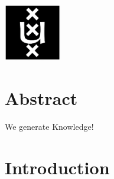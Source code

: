 \documentclass{article}
\newcommand{\red}[1]{{\color{red}{#1}}}
\begin{document}
\begin{titlepage}
\begin{minipage}[t]{0.4\textwidth}
\begin{flushright}
\end{flushright}

\end{minipage}\\[2cm]









\includegraphics[width=2.5cm]{data/images/uva.png}\\ %


 




\vfill %



\end{titlepage}

\section*{Abstract}
We generate Knowledge! \cite{kipf_contrastive_2020}

% 

\section{Introduction}

\end{document}
